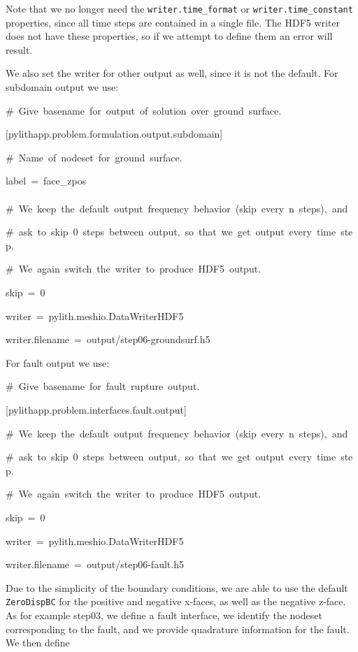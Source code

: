 Note that we no longer need the \texttt{writer.time\_format} or \texttt{writer.time\_constant}
properties, since all time steps are contained in a single file. The
HDF5 writer does not have these properties, so if we attempt to define
them an error will result.

We also set the writer for other output as well, since it is not the
default. For subdomain output we use:
\begin{lyxcode}
\#~Give~basename~for~output~of~solution~over~ground~surface.

{[}pylithapp.problem.formulation.output.subdomain{]}

\#~Name~of~nodeset~for~ground~surface.

label~=~face\_zpos~\\
~\\


\#~We~keep~the~default~output~frequency~behavior~(skip~every~n~steps),~and

\#~ask~to~skip~0~steps~between~output,~so~that~we~get~output~every~time~step.

\#~We~again~switch~the~writer~to~produce~HDF5~output.

skip~=~0

writer~=~pylith.meshio.DataWriterHDF5

writer.filename~=~output/step06-groundsurf.h5~~
\end{lyxcode}
For fault output we use:
\begin{lyxcode}
\#~Give~basename~for~fault~rupture~output.

{[}pylithapp.problem.interfaces.fault.output{]}

\#~We~keep~the~default~output~frequency~behavior~(skip~every~n~steps),~and

\#~ask~to~skip~0~steps~between~output,~so~that~we~get~output~every~time~step.

\#~We~again~switch~the~writer~to~produce~HDF5~output.

skip~=~0

writer~=~pylith.meshio.DataWriterHDF5

writer.filename~=~output/step06-fault.h5
\end{lyxcode}
Due to the simplicity of the boundary conditions, we are able to use
the default \texttt{ZeroDispBC} for the positive and negative x-faces,
as well as the negative z-face. As for example step03, we define a
fault interface, we identify the nodeset corresponding to the fault,
and we provide quadrature information for the fault. We then define
